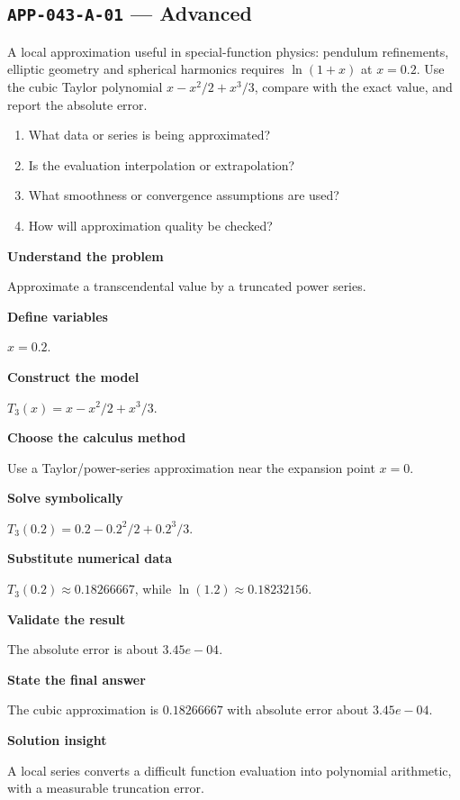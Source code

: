 \documentclass[11pt]{book}
\newcommand{\pid}[1]{\texttt{#1}}
\begin{document}
\subsection*{\pid{APP-043-A-01} — Advanced}
\begin{problembox}
A local approximation useful in special-function physics: pendulum refinements, elliptic geometry and spherical harmonics requires $\ln(1+x)$ at $x=0.2$. Use the cubic Taylor polynomial $x-x^2/2+x^3/3$, compare with the exact value, and report the absolute error.
\end{problembox}
\begin{promptbox}\begin{enumerate}
\item What data or series is being approximated?
\item Is the evaluation interpolation or extrapolation?
\item What smoothness or convergence assumptions are used?
\item How will approximation quality be checked?
\end{enumerate}\end{promptbox}
\begin{solutionbox}
\textbf{Understand the problem}\par Approximate a transcendental value by a truncated power series.\par\medskip
\textbf{Define variables}\par $x=0.2$.\par\medskip
\textbf{Construct the model}\par $T_3(x)=x-x^2/2+x^3/3$.\par\medskip
\textbf{Choose the calculus method}\par Use a Taylor/power-series approximation near the expansion point $x=0$.\par\medskip
\textbf{Solve symbolically}\par $T_3(0.2)=0.2-0.2^2/2+0.2^3/3$.\par\medskip
\textbf{Substitute numerical data}\par $T_3(0.2)\approx 0.18266667$, while $\ln(1.2)\approx 0.18232156$.\par\medskip
\textbf{Validate the result}\par The absolute error is about $3.45e-04$.\par\medskip
\textbf{State the final answer}\par The cubic approximation is $0.18266667$ with absolute error about $3.45e-04$.\par\medskip
\textbf{Solution insight}\par A local series converts a difficult function evaluation into polynomial arithmetic, with a measurable truncation error.\par\medskip
\end{solutionbox}
\end{document}
